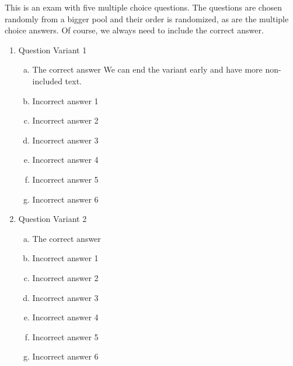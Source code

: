 \documentclass{article}
\begin{document}
This is an exam with five multiple choice questions.
%
The questions are chosen randomly from a bigger pool and their order is
randomized, as are the multiple choice answers.
%
Of course, we always need to include the correct answer.

\begin{enumerate}
  This is the first variant. This text will show up in the template but not
  the generated exams.
\item Question Variant 1
  \begin{enumerate}[a)]
    The correct answer needs to be in its own collection to ensure it's
    always picked.
  \item The correct answer
    We can end the variant early and have more non-included text.
  \item Incorrect answer 1
  \item Incorrect answer 2
  \item Incorrect answer 3
  \item Incorrect answer 4
  \item Incorrect answer 5
  \item Incorrect answer 6
  \end{enumerate}

\item Question Variant 2
  \begin{enumerate}[a)]
  \item The correct answer
  \item Incorrect answer 1
  \item Incorrect answer 2
  \item Incorrect answer 3
  \item Incorrect answer 4
  \item Incorrect answer 5
  \item Incorrect answer 6
  \end{enumerate}


\end{enumerate}
\end{document}
